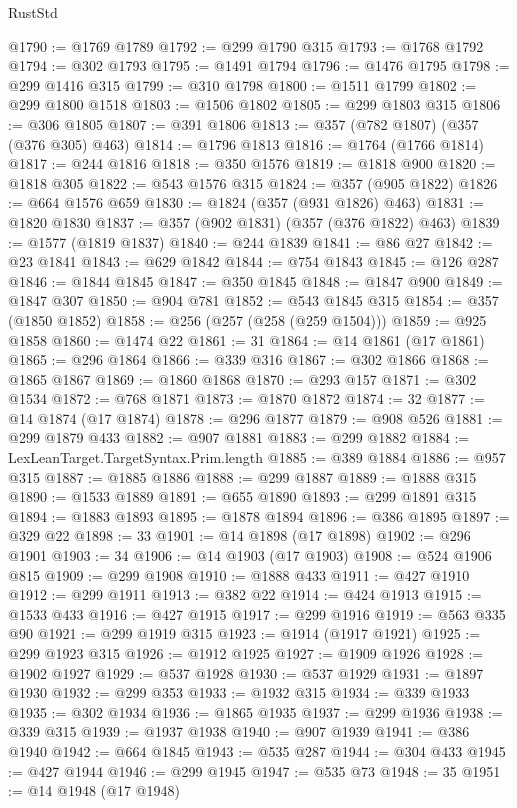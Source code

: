 \begin{lexlean}{RustStd}
\begin{coremodule}
@1790 := @1769 @1789
@1792 := @299 @1790 @315
@1793 := @1768 @1792
@1794 := @302 @1793
@1795 := @1491 @1794
@1796 := @1476 @1795
@1798 := @299 @1416 @315
@1799 := @310 @1798
@1800 := @1511 @1799
@1802 := @299 @1800 @1518
@1803 := @1506 @1802
@1805 := @299 @1803 @315
@1806 := @306 @1805
@1807 := @391 @1806
@1813 := @357 (@782 @1807) (@357 (@376 @305) @463)
@1814 := @1796 @1813
@1816 := @1764 (@1766 @1814)
@1817 := @244 @1816
@1818 := @350 @1576
@1819 := @1818 @900
@1820 := @1818 @305
@1822 := @543 @1576 @315
@1824 := @357 (@905 @1822)
@1826 := @664 @1576 @659
@1830 := @1824 (@357 (@931 @1826) @463)
@1831 := @1820 @1830
@1837 := @357 (@902 @1831) (@357 (@376 @1822) @463)
@1839 := @1577 (@1819 @1837)
@1840 := @244 @1839
@1841 := @86 @27
@1842 := @23 @1841
@1843 := @629 @1842
@1844 := @754 @1843
@1845 := @126 @287
@1846 := @1844 @1845
@1847 := @350 @1845
@1848 := @1847 @900
@1849 := @1847 @307
@1850 := @904 @781
@1852 := @543 @1845 @315
@1854 := @357 (@1850 @1852)
@1858 := @256 (@257 (@258 (@259 @1504)))
@1859 := @925 @1858
@1860 := @1474 @22
@1861 := 31
@1864 := @14 @1861 (@17 @1861)
@1865 := @296 @1864
@1866 := @339 @316
@1867 := @302 @1866
@1868 := @1865 @1867
@1869 := @1860 @1868
@1870 := @293 @157
@1871 := @302 @1534
@1872 := @768 @1871
@1873 := @1870 @1872
@1874 := 32
@1877 := @14 @1874 (@17 @1874)
@1878 := @296 @1877
@1879 := @908 @526
@1881 := @299 @1879 @433
@1882 := @907 @1881
@1883 := @299 @1882
@1884 := LexLeanTarget.TargetSyntax.Prim.length
@1885 := @389 @1884
@1886 := @957 @315
@1887 := @1885 @1886
@1888 := @299 @1887
@1889 := @1888 @315
@1890 := @1533 @1889
@1891 := @655 @1890
@1893 := @299 @1891 @315
@1894 := @1883 @1893
@1895 := @1878 @1894
@1896 := @386 @1895
@1897 := @329 @22
@1898 := 33
@1901 := @14 @1898 (@17 @1898)
@1902 := @296 @1901
@1903 := 34
@1906 := @14 @1903 (@17 @1903)
@1908 := @524 @1906 @815
@1909 := @299 @1908
@1910 := @1888 @433
@1911 := @427 @1910
@1912 := @299 @1911
@1913 := @382 @22
@1914 := @424 @1913
@1915 := @1533 @433
@1916 := @427 @1915
@1917 := @299 @1916
@1919 := @563 @335 @90
@1921 := @299 @1919 @315
@1923 := @1914 (@1917 @1921)
@1925 := @299 @1923 @315
@1926 := @1912 @1925
@1927 := @1909 @1926
@1928 := @1902 @1927
@1929 := @537 @1928
@1930 := @537 @1929
@1931 := @1897 @1930
@1932 := @299 @353
@1933 := @1932 @315
@1934 := @339 @1933
@1935 := @302 @1934
@1936 := @1865 @1935
@1937 := @299 @1936
@1938 := @339 @315
@1939 := @1937 @1938
@1940 := @907 @1939
@1941 := @386 @1940
@1942 := @664 @1845
@1943 := @535 @287
@1944 := @304 @433
@1945 := @427 @1944
@1946 := @299 @1945
@1947 := @535 @73
@1948 := 35
@1951 := @14 @1948 (@17 @1948)

\end{coremodule}
\end{lexlean}
